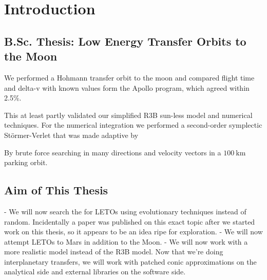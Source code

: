 
\chapter{Introduction}

\section{B.Sc. Thesis: Low Energy Transfer Orbits to the Moon}


We performed a Hohmann transfer orbit to the moon and compared flight time and delta-v with known values form the Apollo program, which agreed within 2.5\%.


This at least partly validated our simplified R3B sun-less model and numerical techniques. For the numerical integration we performed a second-order symplectic Störmer-Verlet that was made adaptive by 


By brute force searching in many directions and velocity vectors in a \(\SI{100}{\km}\) parking orbit.

\section{Aim of This Thesis}


- We will now search the for LETOs using evolutionary techniques instead of random. Incidentally a paper \cite{Izzo2018} was published on this exact topic after we started work on this thesis, so it appears to be an idea ripe for exploration.
- We will now attempt LETOs to Mars in addition to the Moon.
- We will now work with a more realistic model instead of the R3B model. Now that we're doing interplanetary transfers, we will work with patched conic approximations on the analytical side and external libraries on the software side.

